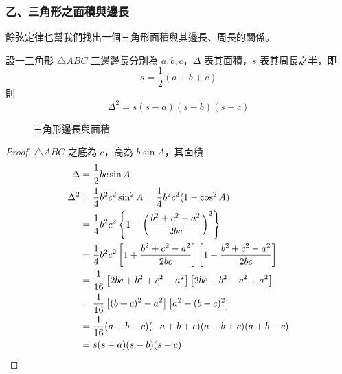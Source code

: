 \subsubsection*{乙、三角形之面積與邊長}

餘弦定律也幫我們找出一個三角形面積與其邊長、周長的關係。

\begin{theorem}
設一三角形 $\triangle ABC$ 三邊邊長分別為 $a, b, c$，$\Delta$ 表其面積，$s$ 表其周長之半，即
\[ s = \frac{1}{2}(a+b+c) \]
則
\begin{equation}
\Delta^2 = s(s-a)(s-b)(s-c) \label{eq:b3-heron}
\end{equation}
\end{theorem}

\begin{figure}[H]
\centering
{}
\caption{三角形邊長與面積}
\label{fig:b3-fig2-42}
\end{figure}

\begin{proof}
$\triangle ABC$ 之底為 $c$，高為 $b\sin A$，其面積
\begin{align*}
\Delta &= \frac{1}{2}bc\sin A \\
\Delta^2 &= \frac{1}{4}b^2 c^2 \sin^2 A = \frac{1}{4}b^2 c^2(1 - \cos^2 A) \\
&= \frac{1}{4}b^2 c^2\left\{1 - \left(\frac{b^2 + c^2 - a^2}{2bc}\right)^2\right\} \\
&= \frac{1}{4}b^2 c^2\left[1 + \frac{b^2 + c^2 - a^2}{2bc}\right]\left[1 - \frac{b^2 + c^2 - a^2}{2bc}\right] \\
&= \frac{1}{16}\left[2bc + b^2 + c^2 - a^2\right]\left[2bc - b^2 - c^2 + a^2\right] \\
&= \frac{1}{16}\left[(b+c)^2 - a^2\right]\left[a^2 - (b-c)^2\right] \\
&= \frac{1}{16}(a+b+c)(-a+b+c)(a-b+c)(a+b-c) \\
&= s(s-a)(s-b)(s-c) \qedhere
\end{align*}
\end{proof}

